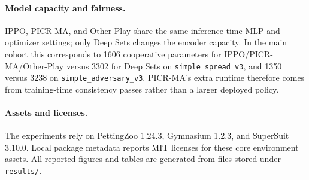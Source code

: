 \documentclass{article}
\begin{document}
\paragraph{Model capacity and fairness.}
IPPO, PICR-MA, and Other-Play share the same inference-time MLP and optimizer settings; only Deep Sets changes the encoder capacity. In the main cohort this corresponds to 1606 cooperative parameters for IPPO/PICR-MA/Other-Play versus 3302 for Deep Sets on \texttt{simple\_spread\_v3}, and 1350 versus 3238 on \texttt{simple\_adversary\_v3}. PICR-MA's extra runtime therefore comes from training-time consistency passes rather than a larger deployed policy.

\paragraph{Assets and licenses.}
The experiments rely on PettingZoo 1.24.3, Gymnasium 1.2.3, and SuperSuit 3.10.0. Local package metadata reports MIT licenses for these core environment assets. All reported figures and tables are generated from files stored under \texttt{results/}.


\end{document}

